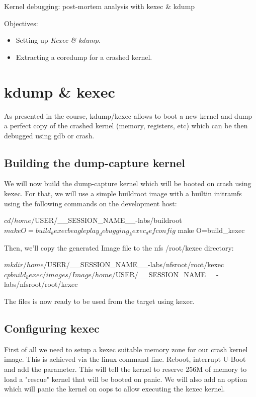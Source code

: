\subchapter
{Kernel debugging: post-mortem analysis with kexec \& kdump}
{Objectives:
  \begin{itemize}
	  \item Setting up {\em Kexec \& kdump}.
	  \item Extracting a coredump for a crashed kernel.
  \end{itemize}
}

\section{kdump \& kexec}

As presented in the course, kdump/kexec allows to boot a new kernel and dump a
perfect copy of the crashed kernel (memory, registers, etc) which can be then
debugged using gdb or crash. 

\subsection{Building the dump-capture kernel}

We will now build the dump-capture kernel which will be booted on crash using
kexec. For that, we will use a simple buildroot image with a builtin initramfs
using the following commands on the development host:

\begin{bashinput}
$ cd /home/$USER/__SESSION_NAME__-labs/buildroot
$ make O=build_kexec beagleplay_debugging_kexec_defconfig
$ make O=build_kexec
\end{bashinput}

Then, we'll copy the generated Image file to the nfs /root/kexec directory:

\begin{bashinput}
$ mkdir /home/$USER/__SESSION_NAME__-labs/nfsroot/root/kexec
$ cp build_kexec/images/Image /home/$USER/__SESSION_NAME__-labs/nfsroot/root/kexec
\end{bashinput}

The files is now ready to be used from the target using kexec.

\subsection{Configuring kexec}

First of all we need to setup a kexec suitable memory zone for our crash kernel
image. This is achieved via the linux command line. Reboot, interrupt U-Boot and
add the  parameter. This will tell the kernel to reserve
256M of memory to load a "rescue" kernel that will be booted on panic. We will
also add an option which will panic the kernel on oops to allow executing the
kexec kernel.


